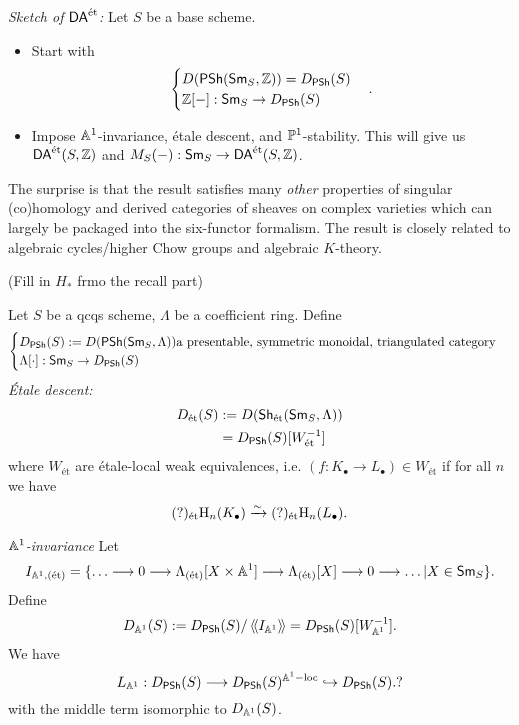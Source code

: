 \emph{Sketch of $\DAet$:} Let $S$ be a base scheme.
\begin{itemize}
\item Start with
\[
\begin{cases}
D(\PSh(\Sm_S, \Z)) = D_{\PSh}(S) \\
\Z[-]: \Sm_S \to D_{\PSh}(S)
\end{cases}
.\]
\item Impose $\Aff^{1}$-invariance, \'etale descent, and $\P^{1}$-stability. This will
give us $\DAet(S,\Z)$ and $M_S(-):\Sm_S\to \DAet(S,\Z)$.
\end{itemize}
The surprise is that the result satisfies many \emph{other} properties of singular
(co)homology and derived categories of sheaves on complex varieties which can largely be
packaged into the six-functor formalism. The result is closely related to algebraic
cycles/higher Chow groups and algebraic $K$-theory.

(Fill in $H_*$ frmo the recall part)

Let $S$ be a qcqs scheme, $\Lambda$ be a coefficient ring. Define
\[
\begin{cases}
D_{\PSh}(S) \defeq D(\PSh(\Sm_S,\Lambda)) \text{a presentable, symmetric monoidal,
triangulated category}\\
\Lambda[\cdot ]:\Sm_S \to D_{\PSh}(S)
\end{cases}
\]
\emph{\'Etale descent:}
\begin{align*}
D_{\text{\'et}}(S) &\defeq D(\Sh_{\text{\'et}}(\Sm_S,\Lambda)) \\
&= D_{\PSh}(S)[W_{\text{\'et}}^{-1}]
\end{align*}
where $W_{\text{\'et}}$ are \'etale-local weak equivalences, i.e. $(f:K_\bullet\to
L_\bullet)\in W_{\text{\'et}}$ if for all $n$ we have
\[
(?)_{\text{\'et}}\CH_n(K_\bullet) \simto (?)_{\text{\'et}}\CH_n(L_\bullet).
\]

\emph{$\Aff^{1}$-invariance}
Let
\[
I_{\Aff^{1},(\text{\'et})} = \{\dots\to 0\to \Lambda_{(\text{\'et})}[X\times \Aff^{1}]\to
\Lambda_{(\text{\'et})}[X]\to 0\to \dots | X\in \Sm_S\} .
\]
Define
\[
D_{\Aff^{1}}(S) \defeq D_{\PSh}(S) / \gen{I_{\Aff^{1}}} = D_{\PSh}(S)[W_{\Aff^{1}}^{-1}].
\]
We have
\[
L_{\Aff^{1}}: D_{\PSh}(S) \to D_{\PSh}(S)^{\Aff^{1}-\text{loc}} \injto D_{\PSh}(S).?
\]
with the middle term isomorphic to $D_{\Aff^{1}}(S)$.

